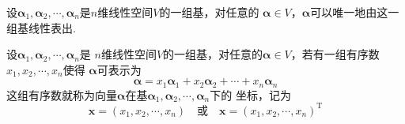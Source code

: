    \begin{theorem}
        设$\boldsymbol{\alpha}_1,\boldsymbol{\alpha}_2,\cdots,\boldsymbol{\alpha}_n$是$n$维线性空间$V$的一组基，对任意的
        $\boldsymbol{\alpha}\in V$，$\boldsymbol{\alpha}$可以唯一地由这一组基线性表出.
    \end{theorem}

    \begin{definition}[坐标]
        设$\boldsymbol{\alpha}_1,\boldsymbol{\alpha}_2,\cdots,\boldsymbol{\alpha}_n$是
        $n$维线性空间$V$的一组基，对任意的$\boldsymbol{\alpha}\in V$，若有一组有序数$x_1,x_2,\cdots,x_n$使得
        $\boldsymbol{\alpha}$可表示为
        $$\boldsymbol{\alpha}=x_1\boldsymbol{\alpha}_1+x_2\boldsymbol{\alpha}_2+\cdots+x_n\boldsymbol{\alpha}_n$$
        这组有序数就称为向量$\boldsymbol{\alpha}$在基$\boldsymbol{\alpha}_1,\boldsymbol{\alpha}_2,\cdots,\boldsymbol{\alpha}_n$下的
        {\heiti 坐标}，记为
        $$\boldsymbol{x}=(x_1,x_2,\cdots,x_n)\quad \mbox{或} \quad \boldsymbol{x}={(x_1,x_2,\cdots,x_n)}^\mathrm{T}$$
    \end{definition}

